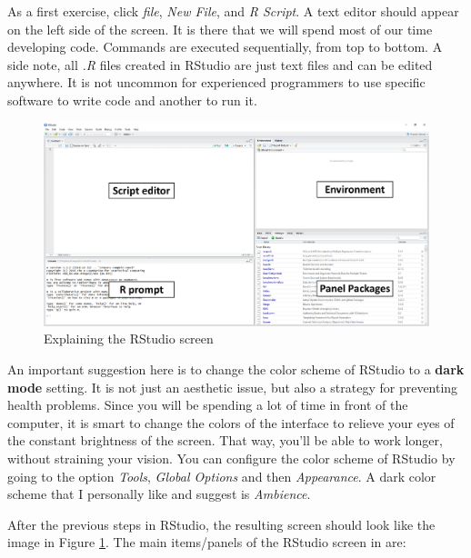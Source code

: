 \documentclass[
  12pt,
]{book}
\newenvironment{rmdimportant}
{\begin{importantblock}
		
	} {\end{importantblock}}
\begin{document}
As a first exercise, click \emph{file}, \emph{New File}, and \emph{R Script}. A text editor should appear on the left side of the screen. It is there that we will spend most of our time developing code. Commands are executed sequentially, from top to bottom. A side note, all \emph{.R} files created in RStudio are just text files and can be edited anywhere. It is not uncommon for experienced programmers to use specific software to write code and another to run it.

\begin{figure}[!htbp]

{\centering \includegraphics[width=1\linewidth]{figs/RStudio2} 

}

\caption{Explaining the RStudio screen}\label{fig:RStudio2}
\end{figure}

\begin{rmdimportant}
An important suggestion here is to change the color scheme of RStudio to
a \textbf{dark mode} setting. It is not just an aesthetic issue, but
also a strategy for preventing health problems. Since you will be
spending a lot of time in front of the computer, it is smart to change
the colors of the interface to relieve your eyes of the constant
brightness of the screen. That way, you'll be able to work longer,
without straining your vision. You can configure the color scheme of
RStudio by going to the option \emph{Tools}, \emph{Global Options} and
then \emph{Appearance}. A dark color scheme that I personally like and
suggest is \emph{Ambience}.
\end{rmdimportant}

After the previous steps in RStudio, the resulting screen should look like the image in Figure \ref{fig:RStudio2}. The main items/panels of the RStudio screen in are:
\end{document}
